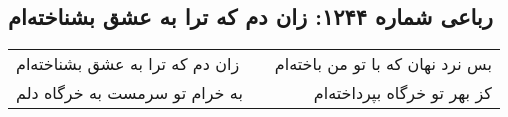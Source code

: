\begin{center}
\section*{رباعی شماره ۱۲۴۴: زان دم که ترا به عشق بشناخته‌ام}
\label{sec:1244}
\begin{longtable}{l p{0.5cm} r}
زان دم که ترا به عشق بشناخته‌ام
&&
بس نرد نهان که با تو من باخته‌ام
\\
به خرام تو سرمست به خرگاه دلم
&&
کز بهر تو خرگاه بپرداخته‌ام
\\
\end{longtable}
\end{center}
